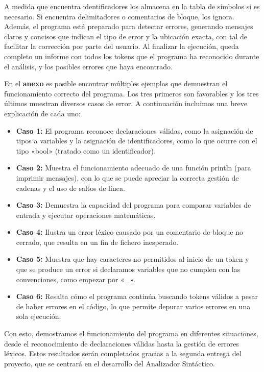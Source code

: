\documentclass{article}
\begin{document}
A medida que encuentra identificadores los almacena en la tabla de símbolos si es necesario. Si encuentra delimitadores o comentarios de bloque, los ignora. Además, el programa está preparado para detectar errores, generando mensajes claros y concisos que indican el tipo de error y la ubicación exacta, con tal de facilitar la corrección por parte del usuario. Al finalizar la ejecución, queda completo un informe con todos los tokens que el programa ha reconocido durante el análisis, y los posibles errores que haya encontrado.

En el \textbf{anexo} es posible encontrar múltiples ejemplos que demuestran el funcionamiento correcto del programa. Los tres primeros son favorables y los tres últimos muestran diversos casos de error. A continuación incluimos una breve explicación de cada uno:

\begin{itemize}
    \item \textbf{Caso 1:} El programa reconoce declaraciones válidas, como la asignación de tipos a variables y la asignación de identificadores, como lo que ocurre con el tipo «bool» (tratado como un identificador).
    
    \item \textbf{Caso 2:} Muestra el funcionamiento adecuado de una función println (para imprimir mensajes), con lo que se puede apreciar la correcta gestión de cadenas y el uso de saltos de línea.
    
    \item \textbf{Caso 3:} Demuestra la capacidad del programa para comparar variables de entrada y ejecutar operaciones matemáticas.
    
    \item \textbf{Caso 4:} Ilustra un error léxico causado por un comentario de bloque no cerrado, que resulta en un fin de fichero inesperado.
    
    \item \textbf{Caso 5:} Muestra que hay caracteres no permitidos al inicio de un token y que se produce un error si declaramos variables que no cumplen con las convenciones, como empezar por «\_».
    
    \item \textbf{Caso 6:} Resalta cómo el programa continúa buscando tokens válidos a pesar de haber errores en el código, lo que permite depurar varios errores en una sola ejecución.
\end{itemize}

Con esto, demostramos el funcionamiento del programa en diferentes situaciones, desde el reconocimiento de declaraciones válidas hasta la gestión de errores léxicos. Estos resultados serán completados gracias a la segunda entrega del proyecto, que se centrará en el desarrollo del Analizador Sintáctico.
\end{document}
